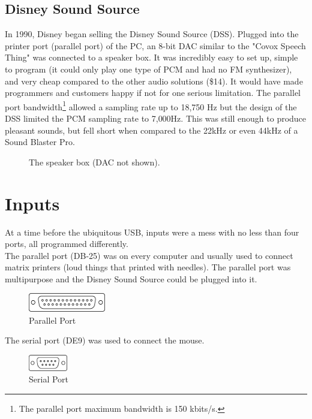 \documentclass[book.tex]{subfiles}
\begin{document}
  \subsection{Disney Sound Source}
  In 1990, Disney began selling the Disney Sound Source (DSS). Plugged into the printer port (parallel port) of the PC, an 8-bit DAC similar to the "Covox Speech Thing" was connected to a speaker box. It was incredibly easy to set up, simple to program (it could only play one type of PCM and had no FM synthesizer), and very cheap compared to the other audio solutions (\$14). It would have made programmers and customers happy if not for one serious limitation. The parallel port bandwidth\footnote{The parallel port maximum bandwidth is 150 kbits/s.} allowed a sampling rate up to 18,750 Hz but the design of the DSS limited the PCM sampling rate to 7,000Hz. This was still enough to produce pleasant sounds, but fell short when compared to the 22kHz or even 44kHz of a Sound Blaster Pro.
  \par
  \begin{figure}[H] 
    \centering 
    \caption{The speaker box (DAC not shown).}
  \end{figure}








\section{Inputs}
At a time before the ubiquitous USB, inputs were a mess with no less than four ports, all programmed differently.\\

The parallel port (DB-25) was on every computer and usually used to connect matrix printers (loud things that printed with needles). The parallel port was multipurpose and the Disney Sound Source could be plugged into it.\\
\par
 \begin{figure}[H]
\centering
\includegraphics[width=0.3\textwidth]{imgs/drawings/ports/DB-25_parallel_port.eps}
\caption{Parallel Port}
\label{fig:parallelPort}
\end{figure}


The serial port (DE9) was used to connect the mouse.
 \begin{figure}[H]
\centering
\includegraphics[width=0.15\textwidth]{imgs/drawings/ports/DE9_serial_port.eps}
\caption{Serial Port}
\label{fig:serialPort}
\end{figure}
\end{document}

